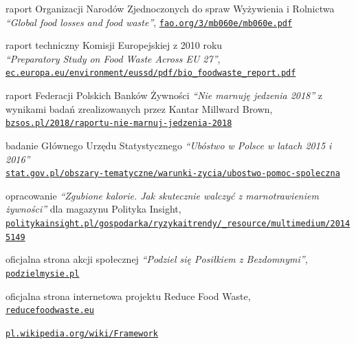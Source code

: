 \documentclass[licencjacka]{pracamgr}
\begin{document}
\begin{thebibliography}{99}

 raport Organizacji Narodów Zjednoczonych do spraw Wyżywienia i Rolnictwa\\\textit{``Global food losses and food waste''}, \href{http://www.fao.org/3/mb060e/mb060e.pdf}{\texttt{fao.org/3/mb060e/mb060e.pdf}}

 raport techniczny Komisji Europejskiej z 2010 roku\\\textit{``Preparatory Study on Food Waste Across EU 27''},\\\href{http://ec.europa.eu/environment/eussd/pdf/bio\_foodwaste\_report.pdf}{\texttt{ec.europa.eu/environment/eussd/pdf/bio\_foodwaste\_report.pdf}}

raport Federacji Polskich Banków Żywności \textit{``Nie marnuję jedzenia 2018''} z wynikami badań zrealizowanych przez Kantar Millward Brown,\\\href{http://bzsos.pl/2018/raportu-nie-marnuj-jedzenia-2018}{\texttt{bzsos.pl/2018/raportu-nie-marnuj-jedzenia-2018}}

badanie Głównego Urzędu Statystycznego \textit{``Ubóstwo w Polsce w latach 2015 i 2016''}\\\href{https://stat.gov.pl/obszary-tematyczne/warunki-zycia/ubostwo-pomoc-spoleczna/ubostwo-w-polsce-w-latach-2015-i-2016,1,8.html}{\texttt{stat.gov.pl/obszary-tematyczne/warunki-zycia/ubostwo-pomoc-spoleczna}}

opracowanie \textit{``Zgubione kalorie. Jak skutecznie walczyć z marnotrawieniem żywności''} dla magazynu Polityka Insight,\\\href{http://politykainsight.pl/gospodarka/ryzykaitrendy/\_resource/multimedium/20145149}{\texttt{politykainsight.pl/gospodarka/ryzykaitrendy/\_resource/multimedium/20145149}}

 oficjalna strona akcji społecznej \textit{``Podziel się Posiłkiem z Bezdomnymi''}, \href{http://www.podzielmysie.pl}{\texttt{podzielmysie.pl}}

 oficjalna strona internetowa projektu Reduce Food Waste,\\
    \href{http://www.reducefoodwaste.eu}{\texttt{reducefoodwaste.eu}}

 \href{https://pl.wikipedia.org/wiki/Framework}{\texttt{pl.wikipedia.org/wiki/Framework}}


\end{thebibliography}
\end{document}
